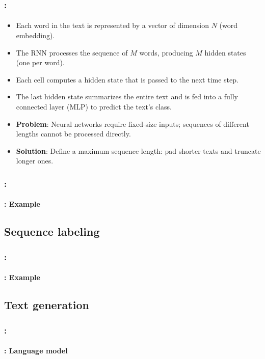 \documentclass[xcolor=table]{beamer}
\begin{document}
\begin{frame}
	\frametitle{\insertshortsubtitle: \insertsection}
	\framesubtitle{\insertsubsection}
	
	\begin{itemize}
		\item Each word in the text is represented by a vector of dimension $N$ (word embedding).
		\item The RNN processes the sequence of $M$ words, producing $M$ hidden states (one per word).
		\item Each cell computes a hidden state that is passed to the next time step.
		\item The last hidden state summarizes the entire text and is fed into a fully connected layer (MLP) to predict the text's class.
		\item \textbf{Problem}: Neural networks require fixed-size inputs; sequences of different lengths cannot be processed directly.
		\item \textbf{Solution}: \textcolor{yellow!30}{Define a maximum sequence length: pad shorter texts and truncate longer ones.}
	\end{itemize}
	
	
\end{frame}

\begin{frame}
	\frametitle{\insertshortsubtitle: \insertsection}
	\framesubtitle{\insertsubsection: Example}
	
	
\end{frame}


\subsection{Sequence labeling}

\begin{frame}
	\frametitle{\insertshortsubtitle: \insertsection}
	\framesubtitle{\insertsubsection: Example}
	
	
\end{frame}


\subsection{Text generation}

\begin{frame}
	\frametitle{\insertshortsubtitle: \insertsection}
	\framesubtitle{\insertsubsection: Language model}
	
	
\end{frame}
\end{document}
